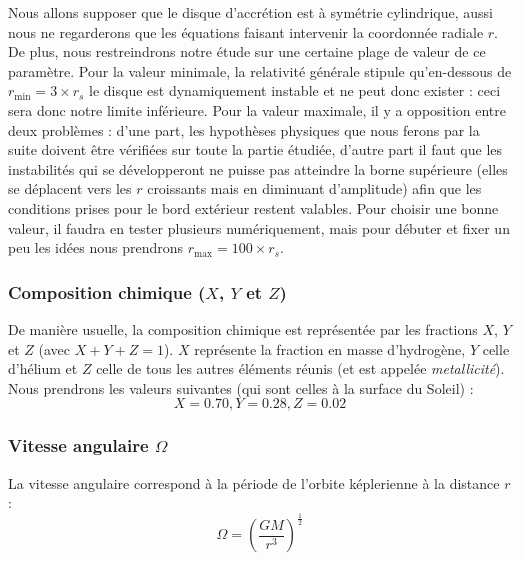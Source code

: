Nous allons supposer que le disque d’accrétion est à symétrie cylindrique,
aussi nous ne regarderons que les équations faisant intervenir la coordonnée
radiale $r$. De plus, nous restreindrons notre étude sur une certaine plage de
valeur de ce paramètre. Pour la valeur minimale, la relativité générale stipule
qu’en-dessous de $r_\mathrm{min} = 3 \times r_s$ le disque est dynamiquement
instable et ne peut donc exister : ceci sera donc notre limite inférieure. Pour
la valeur maximale, il y a opposition entre deux problèmes : d’une part, les
hypothèses physiques que nous ferons par la suite doivent être vérifiées sur
toute la partie étudiée, d’autre part il faut que les instabilités qui se
développeront ne puisse pas atteindre la borne supérieure (elles se déplacent
vers les $r$ croissants mais en diminuant d’amplitude) afin que les conditions
prises pour le bord extérieur restent valables. Pour choisir une bonne
valeur, il faudra en tester plusieurs numériquement, mais pour débuter et fixer
un peu les idées nous prendrons $r_\mathrm{max} = 100 \times r_s$.

\subsubsection{\texorpdfstring{Composition chimique ($X$, $Y$ et $Z$)}{Composition chimique (X, Y et Z)}}

De manière usuelle, la composition chimique est représentée par les fractions
$X$, $Y$ et $Z$ (avec $X + Y + Z = 1$). $X$ représente la fraction en masse
d’hydrogène, $Y$ celle d’hélium et $Z$ celle de tous les autres éléments réunis
(et est appelée \textit{metallicité}). Nous prendrons les valeurs suivantes
(qui sont celles à la surface du Soleil) :
\begin{equation}
    \label{eq:compo_chimique}
    X = 0.70, Y = 0.28, Z = 0.02
\end{equation}

\subsubsection{\texorpdfstring{Vitesse angulaire $\Omega$}{Vitesse angulaire Ω}}

La vitesse angulaire correspond à la période de l’orbite képlerienne à la
distance $r$ :
\begin{equation}
    \label{eq:vitesse_angulaire}
    \Omega = \left( \frac{G M}{r^3} \right)^\frac{1}{2}
\end{equation}

